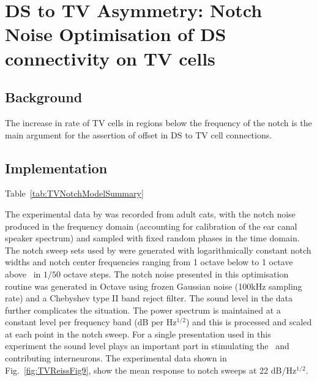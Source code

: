 

\section[TV to DS Asymmetry]{DS to TV Asymmetry: Notch Noise Optimisation of DS connectivity on TV cells} \label{sec:TV-cell-model}

\subsection{Background}

The increase in rate of TV cells in regions below the frequency of the notch is
the main argument for the assertion of offset in DS to TV cell connections.

\subsection{Implementation}

Table~\ref{tab:TVNotchModelSummary} 

The experimental data by \citet{ReissYoung:2005} was recorded from adult cats, with the notch noise produced in the frequency domain (accounting for calibration of the ear canal speaker spectrum) and sampled with fixed random phases in the time domain.
The notch sweep sets used by \citeauthor{ReissYoung:2005} were generated with logarithmically constant notch widths and notch center frequencies ranging from 1 octave below to 1 octave above \BF~in $1/50$ octave steps.
The notch noise presented in this optimisation routine was generated in Octave using frozen Gaussian noise (100kHz sampling rate) and a Chebyshev type II band reject filter.
The sound level in the \citet{ReissYoung:2005} data further complicates the situation.
The power spectrum is maintained at a constant level per frequency band (dB per Hz$^{1/2}$) and this is processed and scaled at each point in the notch sweep.
For a single presentation used in this experiment the sound level plays an important part in stimulating the \ANFs~and contributing interneurons.
The experimental data shown in Fig.~\ref{fig:TVReissFig9}, show the mean response to notch sweeps at 22 dB/Hz$^{1/2}$.

